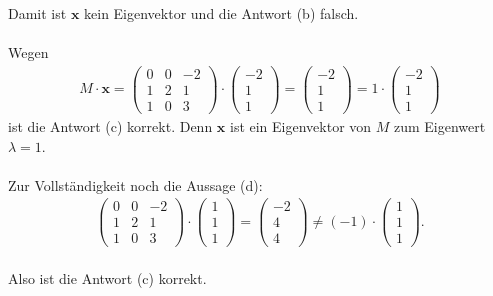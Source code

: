 Damit ist $ \textbf{x} $ kein Eigenvektor und die Antwort (b) falsch.\\
\\
Wegen 
\begin{align*}
M \cdot \textbf{x} = 
\begin{pmatrix}
0 & 0 & -2\\
1 & 2 & 1\\
1 & 0 & 3
\end{pmatrix}
\cdot 
\begin{pmatrix}
-2 \\ 1 \\ 1
\end{pmatrix}
=
\begin{pmatrix}
-2 \\ 1 \\ 1
\end{pmatrix}
 = 
 1 \cdot \begin{pmatrix}
 -2 \\ 1 \\ 1
 \end{pmatrix}
\end{align*}
ist die Antwort (c) korrekt. Denn $ \textbf{x} $  ist ein Eigenvektor von $ M $ zum Eigenwert $ \lambda = 1 $.\\
\\
Zur Vollständigkeit noch die Aussage (d):
 \begin{align*}
 \begin{pmatrix}
 0 & 0 & -2\\
 1 & 2 & 1\\
 1 & 0 & 3
 \end{pmatrix}
 \cdot 
 \begin{pmatrix}
 1 \\ 1 \\ 1
 \end{pmatrix}
 =
  \begin{pmatrix}
-2 \\ 4 \\ 4
 \end{pmatrix}
 \neq
 (-1) \cdot  \begin{pmatrix}
 1 \\ 1 \\ 1
 \end{pmatrix}.
 \end{align*}
\ \\
Also ist die Antwort (c) korrekt.
